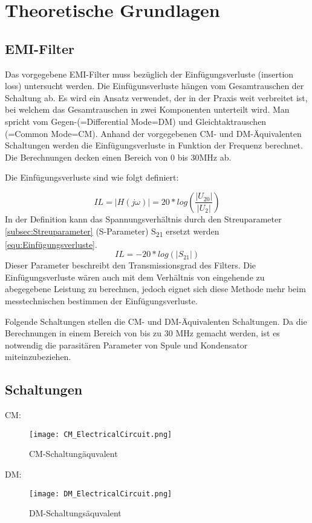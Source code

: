 \section{Theoretische Grundlagen} \label{sec:TheoretischeGrundlagen}

\subsection{EMI-Filter} \label{subsec:emifilter}
Das vorgegebene EMI-Filter muss bezüglich der Einfügungsverluste (insertion loss) untersucht werden. Die Einfügunsverluste hängen vom Gesamtrauschen der Schaltung ab. Es wird ein Ansatz verwendet, der in der Praxis weit verbreitet ist, bei welchem das Gesamtrauschen in zwei Komponenten unterteilt wird. Man spricht vom Gegen-(=Differential Mode=DM) und Gleichtaktrauschen (=Common Mode=CM). Anhand der vorgegebenen CM- und DM-Äquivalenten Schaltungen werden die Einfügungsverluste in Funktion der Frequenz berechnet. Die Berechnungen decken einen Bereich von 0 bis 30MHz ab.

Die Einfügungsverluste sind wie folgt definiert: 

\begin{equation}\label{equ:Freqgang}
IL = \left\lvert H(j\omega) \right\rvert = 20*log(\frac{ \left\lvert U_{20} \right\rvert }{ \left\lvert U_2 \right\rvert })
\end{equation}
In der Definition kann das Spannungsverhältnis durch den Streuparameter \ref{subsec:Streuparameter} (S-Parameter) S\textsubscript{21} ersetzt werden \ref{equ:Einfügungsverluste}.
\begin{equation}\label{equ:Einfügungsverluste}
IL = -20*log (\left\lvert S_{21} \right\rvert)
\end{equation}
 Dieser Parameter beschreibt den Transmissionsgrad des Filters. Die Einfügungsverluste wären auch mit dem Verhältnis von eingehende zu abegegebene Leistung zu berechnen, jedoch eignet sich diese Methode mehr beim messtechnischen bestimmen der Einfügungsverluste. 

Folgende Schaltungen stellen die CM- und DM-Äquivalenten Schaltungen. Da die Berechnungen in einem Bereich von bis zu 30 MHz gemacht werden, ist es notwendig die parasitären Parameter von Spule und Kondensator miteinzubeziehen.
\newpage
\subsection{Schaltungen} \label{subsec:schaltungen}
CM:
\begin{figure}[H]
	\centering
	\texttt{[image: CM\_ElectricalCircuit.png]}
	\caption{CM-Schaltungäquvalent}
	\label{fig:CM-Schaltungäquvalent}
\end{figure}
DM:
\begin{figure}[H]
	\centering
	\texttt{[image: DM\_ElectricalCircuit.png]}
	\caption{DM-Schaltungsäquvalent}
	\label{fig:DM-Schaltungsäquvalent}
\end{figure}
\newpage
